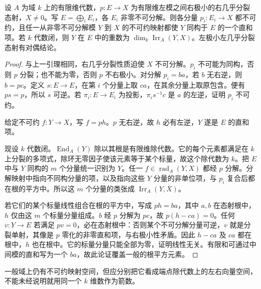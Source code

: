 \begin{proposition}\label{b5:prop:almost-split-components}
	设 \(A\) 为域 \(k\) 上的有限维代数，\(p:E\to X\) 为有限维左模之间右极小的右几乎分裂态射，\(X\ne0\)。写 \(E=\bigoplus_iE_i\)，各 \(E_i\) 非零不可分解。则各分量 \(p_i:E_i\to X\) 都不可约，且任一从非零不可分解模 \(Y\) 到 \(X\) 的不可约映射都使 \(Y\) 同构于 \(E\) 的一个直和项。若 \(k\) 代数闭，则 \(Y\) 在 \(E\) 中的重数为 \(\dim_k\operatorname{Irr}_A(Y,X)\)。左极小左几乎分裂态射有对偶结论。
\end{proposition}
\begin{proof}
	与上一引理相同，右几乎分裂性质迫使 \(X\) 不可分解。\(p_i\) 不可能为同构，否则 \(p\) 分裂；也不能为零，否则 \(p\) 不右极小。对分解 \(p_i=ba\)，若 \(b\) 无右逆，则 \(b=pc\)。定义 \(s:E\to E\)，在第 \(i\) 个分量上取 \(ca\)，在其余分量上取原包含。便有 \(ps=p\)，所以 \(s\) 可逆。若 \(\pi_i:E\to E_i\) 为投影，\(\pi_i s^{-1}c\) 是 \(a\) 的左逆，证明 \(p_i\) 不可约。

	给定不可约 \(f:Y\to X\)，写 \(f=ph\)。\(p\) 无右逆，故 \(h\) 必有左逆，\(Y\) 遂是 \(E\) 的直和项。

	现设 \(k\) 代数闭。\(\operatorname{End}_A(Y)\) 除以其根是有限维除代数。它的每个元素都满足在 \(k\) 上分裂的多项式，除环无零因子使该元素等于某个标量，故这个除代数为 \(k\)。把 \(E\) 中与 \(Y\) 同构的 \(m\) 个分量统一识别为 \(Y\)。任一 \(f\in\operatorname{rad}_A(Y,X)\) 都经 \(p\) 分解。分解映射中指向不同构分量的项，以及指向这些 \(Y\) 分量的非单位项，与 \(p_i\) 复合后都在根的平方中。所以这 \(m\) 个分量的类张成 \(\operatorname{Irr}_A(Y,X)\)。

	若它们的某个标量线性组合在根的平方中，写成 \(ph=ba\)，其中 \(a,b\) 在态射根中，\(h\) 仅由这 \(m\) 个标量分量组成。\(b\) 经 \(p\) 分解为 \(pc\)，故 \(p(h-ca)=0\)。任何 \(v:Y\to E\) 若满足 \(pv=0\)，必在态射根中：否则某个不可分解分量可逆，\(v\) 就是分裂单射，其像是 \(p\) 零化的非零直和项，与右极小性矛盾。因此 \(h-ca\) 及 \(ca\) 都在根中，\(h\) 也在根中。它的标量分量只能全部为零，证明线性无关。有限和可通过中间模的直和写为一个 \(ba\)，故此论证覆盖一般的根平方元素。
\end{proof}

一般域上仍有不可约映射空间，但应分别把它看成端点除代数上的左右向量空间，不能未经说明就用同一个 \(k\) 维数作为箭数。

